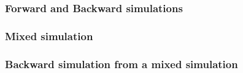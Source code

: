\label{sec:mixedsim}
\subsubsection{Forward and Backward simulations}
\subsubsection{Mixed simulation}
\subsubsection{Backward simulation from a mixed simulation}
